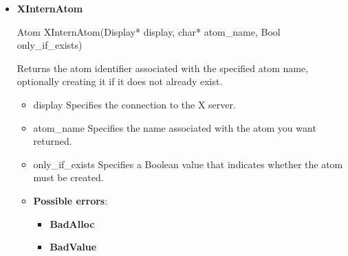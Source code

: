 \documentclass{report}
\begin{document}
\begin{itemize}
\begin{cppcode}
{                    int base_width, base_height;
                    int win_gravity;
                    /* this structure may be extended in the future */
                } XSizeHints;
            \end{cppcode}
            \begin{cppcode}
                typedef struct {
                    char *res_name;
                    char *res_class;
                } XClassHint;
            \end{cppcode}
            \begin{cppcode}
            typedef struct {
                int min_width, min_height;
                int max_width, max_height;
                int width_inc, height_inc;
            } XIconSize;
            \end{cppcode}
        \item \textbf{XInternAtom}
            \bigbreak \noindent 
            \begin{cppcode}
                Atom XInternAtom(Display* display, char* atom_name, Bool only_if_exists)
            \end{cppcode}
            \bigbreak \noindent
            Returns the atom identifier associated with the specified atom name, optionally creating it if it does not already exist.
            \begin{itemize}
                \item display Specifies the connection to the X server.
                \item atom\_name Specifies the name associated with the atom you want returned.
                \item only\_if\_exists Specifies a Boolean value that indicates whether the atom must be created.
            \end{itemize}
            \begin{itemize}
                \item \textbf{Possible errors}:
                    \begin{itemize}
                        \item \textbf{BadAlloc}
                        \item \textbf{BadValue}
                    \end{itemize}
            \end{itemize}


\end{itemize}
\end{document}

